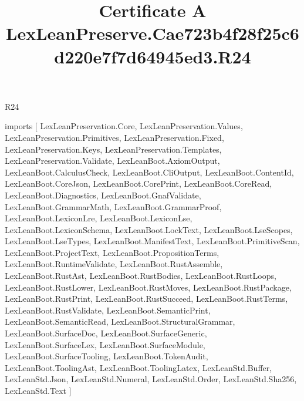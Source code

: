 \begin{lexlean}{R24}
\title{Certificate A LexLeanPreserve.Cae723b4f28f25c6d220e7f7d64945ed3.R24}
\begin{coremodule}
imports [
  LexLeanPreservation.Core,
  LexLeanPreservation.Values,
  LexLeanPreservation.Primitives,
  LexLeanPreservation.Fixed,
  LexLeanPreservation.Keys,
  LexLeanPreservation.Templates,
  LexLeanPreservation.Validate,
  LexLeanBoot.AxiomOutput,
  LexLeanBoot.CalculusCheck,
  LexLeanBoot.CliOutput,
  LexLeanBoot.ContentId,
  LexLeanBoot.CoreJson,
  LexLeanBoot.CorePrint,
  LexLeanBoot.CoreRead,
  LexLeanBoot.Diagnostics,
  LexLeanBoot.GnafValidate,
  LexLeanBoot.GrammarMath,
  LexLeanBoot.GrammarProof,
  LexLeanBoot.LexiconLre,
  LexLeanBoot.LexiconLse,
  LexLeanBoot.LexiconSchema,
  LexLeanBoot.LockText,
  LexLeanBoot.LseScopes,
  LexLeanBoot.LseTypes,
  LexLeanBoot.ManifestText,
  LexLeanBoot.PrimitiveScan,
  LexLeanBoot.ProjectText,
  LexLeanBoot.PropositionTerms,
  LexLeanBoot.RuntimeValidate,
  LexLeanBoot.RustAssemble,
  LexLeanBoot.RustAst,
  LexLeanBoot.RustBodies,
  LexLeanBoot.RustLoops,
  LexLeanBoot.RustLower,
  LexLeanBoot.RustMoves,
  LexLeanBoot.RustPackage,
  LexLeanBoot.RustPrint,
  LexLeanBoot.RustSucceed,
  LexLeanBoot.RustTerms,
  LexLeanBoot.RustValidate,
  LexLeanBoot.SemanticPrint,
  LexLeanBoot.SemanticRead,
  LexLeanBoot.StructuralGrammar,
  LexLeanBoot.SurfaceDoc,
  LexLeanBoot.SurfaceGeneric,
  LexLeanBoot.SurfaceLex,
  LexLeanBoot.SurfaceModule,
  LexLeanBoot.SurfaceTooling,
  LexLeanBoot.TokenAudit,
  LexLeanBoot.ToolingAst,
  LexLeanBoot.ToolingLatex,
  LexLeanStd.Buffer,
  LexLeanStd.Json,
  LexLeanStd.Numeral,
  LexLeanStd.Order,
  LexLeanStd.Sha256,
  LexLeanStd.Text
]


\end{coremodule}
\end{lexlean}
